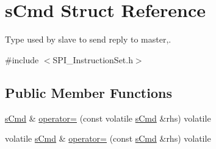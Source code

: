 \hypertarget{structs_cmd}{}\section{s\+Cmd Struct Reference}
\label{structs_cmd}


Type used by slave to send reply to master,.  




{\ttfamily \#include $<$S\+P\+I\+\_\+\+Instruction\+Set.\+h$>$}

\subsection*{Public Member Functions}
\begin{DoxyCompactItemize}
\item 
\mbox{\hyperlink{structs_cmd}{s\+Cmd}} \& \mbox{\hyperlink{structs_cmd_a3b1f47c680cdde48d2c8679599547516}{operator=}} (const volatile \mbox{\hyperlink{structs_cmd}{s\+Cmd}} \&rhs) volatile
\item 
volatile \mbox{\hyperlink{structs_cmd}{s\+Cmd}} \& \mbox{\hyperlink{structs_cmd_a88ec1d5b2730bd3e2e2c9902c3ccde34}{operator=}} (const \mbox{\hyperlink{structs_cmd}{s\+Cmd}} \&rhs) volatile
\end{DoxyCompactItemize}
